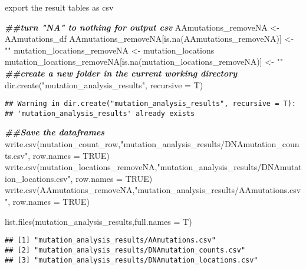 \documentclass[
]{article}
\newenvironment{Shaded}{\begin{snugshade}}{\end{snugshade}}
\newcommand{\AttributeTok}[1]{\textcolor[rgb]{0.77,0.63,0.00}{#1}}
\newcommand{\ConstantTok}[1]{\textcolor[rgb]{0.00,0.00,0.00}{#1}}
\newcommand{\DocumentationTok}[1]{\textcolor[rgb]{0.56,0.35,0.01}{\textbf{\textit{#1}}}}
\newcommand{\FunctionTok}[1]{\textcolor[rgb]{0.00,0.00,0.00}{#1}}
\newcommand{\NormalTok}[1]{#1}
\newcommand{\OtherTok}[1]{\textcolor[rgb]{0.56,0.35,0.01}{#1}}
\newcommand{\StringTok}[1]{\textcolor[rgb]{0.31,0.60,0.02}{#1}}
\begin{document}
export the result tables as csv

\begin{Shaded}
\begin{Highlighting}[]
\DocumentationTok{\#\#turn "NA" to nothing for output csv}
\NormalTok{AAmutations\_removeNA }\OtherTok{\textless{}{-}}\NormalTok{ AAmutations\_df}
\NormalTok{AAmutations\_removeNA[}\FunctionTok{is.na}\NormalTok{(AAmutations\_removeNA)] }\OtherTok{\textless{}{-}} \StringTok{""}
\NormalTok{mutation\_locations\_removeNA }\OtherTok{\textless{}{-}}\NormalTok{ mutation\_locations}
\NormalTok{mutation\_locations\_removeNA[}\FunctionTok{is.na}\NormalTok{(mutation\_locations\_removeNA)] }\OtherTok{\textless{}{-}} \StringTok{""}
\DocumentationTok{\#\#create a new folder in the current working directory }
\FunctionTok{dir.create}\NormalTok{(}\StringTok{"mutation\_analysis\_results"}\NormalTok{, }\AttributeTok{recursive =}\NormalTok{ T)}
\end{Highlighting}
\end{Shaded}

\begin{verbatim}
## Warning in dir.create("mutation_analysis_results", recursive = T):
## 'mutation_analysis_results' already exists
\end{verbatim}

\begin{Shaded}
\begin{Highlighting}[]
\DocumentationTok{\#\#Save the dataframes }
\FunctionTok{write.csv}\NormalTok{(mutation\_count\_row,}\StringTok{"mutation\_analysis\_results/DNAmutation\_counts.csv"}\NormalTok{, }\AttributeTok{row.names =} \ConstantTok{TRUE}\NormalTok{)}
\FunctionTok{write.csv}\NormalTok{(mutation\_locations\_removeNA,}\StringTok{"mutation\_analysis\_results/DNAmutation\_locations.csv"}\NormalTok{, }\AttributeTok{row.names =} \ConstantTok{TRUE}\NormalTok{)}
\FunctionTok{write.csv}\NormalTok{(AAmutations\_removeNA,}\StringTok{"mutation\_analysis\_results/AAmutations.csv"}\NormalTok{, }\AttributeTok{row.names =} \ConstantTok{TRUE}\NormalTok{)}

\FunctionTok{list.files}\NormalTok{(}\StringTok{\textquotesingle{}mutation\_analysis\_results\textquotesingle{}}\NormalTok{,}\AttributeTok{full.names =}\NormalTok{ T)}
\end{Highlighting}
\end{Shaded}

\begin{verbatim}
## [1] "mutation_analysis_results/AAmutations.csv"          
## [2] "mutation_analysis_results/DNAmutation_counts.csv"   
## [3] "mutation_analysis_results/DNAmutation_locations.csv"
\end{verbatim}
\end{document}
